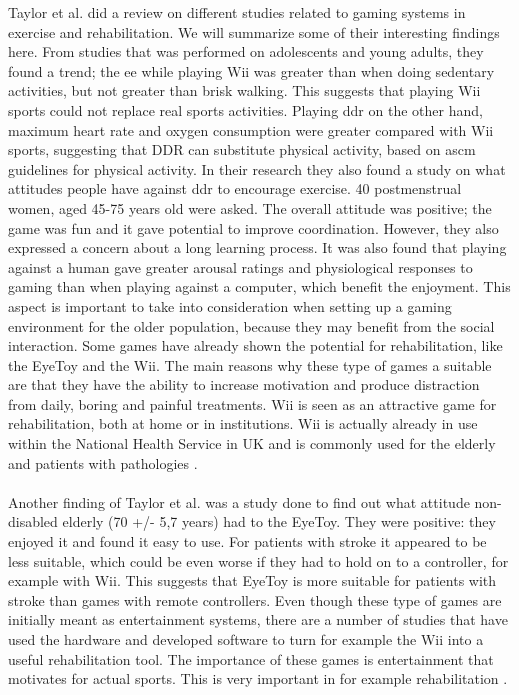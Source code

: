 Taylor et al. \cite{taylor2011activity} did a review on different studies related to gaming systems in exercise and rehabilitation. We will summarize some of their interesting findings here. From studies that was performed on adolescents and young adults, they found a trend; the  \ac{ee} while playing Wii was greater than when doing sedentary activities, but not greater than brisk walking. This suggests that playing Wii sports could not replace real sports activities. Playing \ac{ddr} on the other hand, maximum heart rate and oxygen consumption were greater compared with Wii sports, suggesting that DDR can substitute physical activity, based on \ac{ascm} guidelines for physical activity. In their research they also found a study on what attitudes people have against \ac{ddr} to encourage exercise. 40 postmenstrual women, aged 45-75 years old were asked. The overall attitude was positive; the game was fun and it gave potential to improve coordination. However, they also expressed a concern about a long learning process. It was also found that playing against a human gave greater arousal ratings and physiological responses to gaming than when playing against a computer, which benefit the enjoyment. This aspect is important to take into consideration when setting up a gaming environment for the older population, because they may benefit from the social interaction. Some games have already shown the potential for rehabilitation, like the EyeToy and the Wii. The main reasons why these type of games a suitable are that they have the ability to increase motivation and produce distraction from daily, boring and painful treatments. Wii is seen as an attractive game for rehabilitation, both at home or in institutions. Wii is actually already in use within the National Health Service in UK and is commonly used for the elderly and patients with pathologies  \cite{taylor2011activity}. \\ \\
Another finding of Taylor et al. was a study done to find out what attitude non-disabled elderly (70 +/- 5,7 years) had to the EyeToy. They were positive: they enjoyed it and found it easy to use. For patients with stroke it appeared to be less suitable, which could be even worse if they had to hold on to a controller, for example with Wii. This suggests that EyeToy is more suitable for patients with stroke than games with remote controllers.  
Even though these type of games are initially meant as entertainment systems, there are a number of studies that have used the hardware and developed software to turn for example the Wii into a useful rehabilitation tool. The importance of these games is entertainment that motivates for actual sports. This is very important in for example rehabilitation \cite{taylor2011activity}. \\ \\
